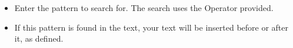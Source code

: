 \begin{itemize}
\item Enter the pattern to search for. The search uses the Operator provided.
\item If this pattern is found in the text, your text will be inserted before or after it, as defined.
\end{itemize}

    